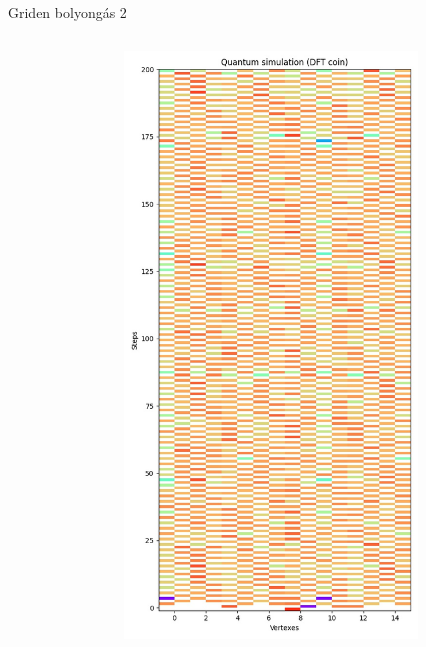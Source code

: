 \documentclass[aspectratio=169]{beamer}
\begin{document}
\begin{frame}{Griden bolyongás 2}
\begin{columns}[onlytextwidth]
\begin{column}{.25\textwidth}
\begin{figure}
      \end{figure}
    \end{column}
    \begin{column}{.25\textwidth}
      \begin{figure}
        \includegraphics[width=0.9\textwidth]{./tdk_figures/results/grid/dft.jpg}
      \end{figure}
    \end{column}
    \begin{column}{.25\textwidth}
    \end{column}
  \end{columns}
\end{frame}
\end{document}
